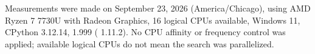 Measurements were made on September 23, 2026 (America/Chicago), using AMD Ryzen 7 7730U with Radeon Graphics, 16 logical CPUs available, Windows 11, CPython 3.12.14,  1.999 ( 1.11.2). No CPU affinity or frequency control was applied; available logical CPUs do not mean the search was parallelized.
